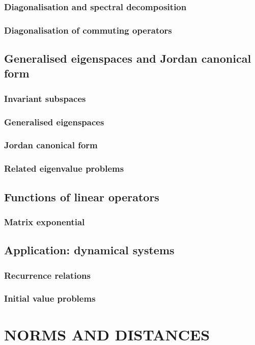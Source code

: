 \documentclass[a4paper,twoside]{article}
\theoremstyle{definition}
\theoremstyle{plain}
\begin{document}
\subsubsection{Diagonalisation and spectral decomposition}
\subsubsection{Diagonalisation of commuting operators}
\subsection{Generalised eigenspaces and Jordan canonical form}
\subsubsection{Invariant subspaces}
\subsubsection{Generalised eigenspaces}
\subsubsection{Jordan canonical form}
\subsubsection{Related eigenvalue problems}
\subsection{Functions of linear operators}
\subsubsection{Matrix exponential}
\subsection{Application: dynamical systems}
\subsubsection{Recurrence relations}
\subsubsection{Initial value problems}

\section{NORMS AND DISTANCES}
\end{document}
